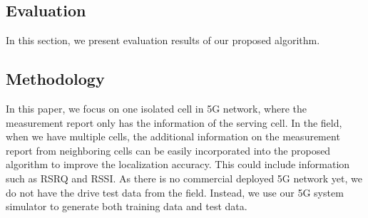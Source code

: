 \documentclass[conference, 10pt]{IEEEtran}
\begin{document}
\begin{NoHyper}


\section{Evaluation}
\label{sec:eval}
In this section, we present evaluation results of our proposed algorithm. 
\subsection{Methodology}
In this paper, we focus on one isolated cell in 5G network, where the measurement report
only has the information of the serving cell. In the field, when we have multiple cells, the additional
information on the measurement report from neighboring cells can be easily incorporated into the proposed algorithm to improve the 
localization accuracy. This could include information such as RSRQ and RSSI. As there is no commercial deployed 5G network yet, we do not have the drive test data from the field.
Instead, we use our 5G system simulator to generate both training data and test data.


\end{NoHyper}
\end{document}
